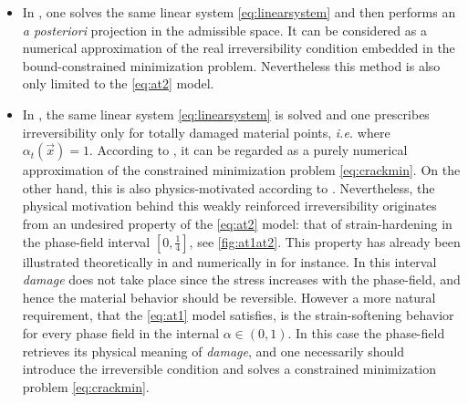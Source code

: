 \begin{itemize}
\item In \cite{LancioniRoyer-Carfagni:2009}, one solves the same linear system \eqref{eq:linearsystem} and then performs an \emph{a posteriori} projection in the admissible space. It can be considered as a numerical approximation of the real irreversibility condition embedded in the bound-constrained minimization problem. Nevertheless this method is also only limited to the \eqref{eq:at2} model.

\item In \cite{BourdinFrancfortMarigo:2000,SchlueterWillenbuecherKuhnMueller:2014}, the same linear system \eqref{eq:linearsystem} is solved and one prescribes irreversibility only for totally damaged material points, \emph{i.e.} where $\alpha_t(\vec{x})=1$. According to \cite{AmorMarigoMaurini:2009}, it can be regarded as a purely numerical approximation of the constrained minimization problem \eqref{eq:crackmin}. On the other hand, this is also physics-motivated according to \cite{SchlueterWillenbuecherKuhnMueller:2014}. Nevertheless, the physical motivation behind this weakly reinforced irreversibility originates from an undesired property of the \eqref{eq:at2} model: that of strain-hardening in the phase-field interval $[0,\frac{1}{4}]$, see \cref{fig:at1at2}. This property has already been illustrated theoretically in \cite{PhamAmorMarigoMaurini:2011} and numerically in \cite{BordenVerhooselScottHughesLandis:2012} for instance. In this interval \emph{damage} does not take place since the stress increases with the phase-field, and hence the material behavior should be reversible. However a more natural requirement, that the \eqref{eq:at1} model satisfies, is the strain-softening behavior for every phase field in the internal $\alpha\in(0,1)$. In this case the phase-field retrieves its physical meaning of \emph{damage}, and one necessarily should introduce the irreversible condition and solves a constrained minimization problem \eqref{eq:crackmin}.
\end{itemize}

